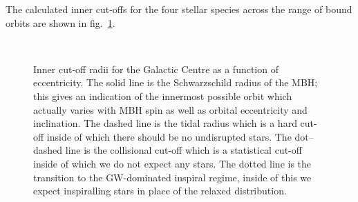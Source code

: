 \documentclass[useAMS,usedcolumn,usegraphicx,usenatbib]{mn2e}
\newcommand{\figref}[1]{fig.~\ref{fig:#1}}
\begin{document}
The calculated inner cut-offs for the four stellar species across the range of bound orbits are shown in \figref{Cuts}.
\begin{figure}
\begin{center}
    \quad 
    \\
    \quad
\caption{Inner cut-off radii for the Galactic Centre as a function of eccentricity. The solid line is the Schwarzschild radius of the MBH; this gives an indication of the innermost possible orbit which actually varies with MBH spin as well as orbital eccentricity and inclination. The dashed line is the tidal radius which is a hard cut-off inside of which there should be no undisrupted stars. The dot--dashed line is the collisional cut-off which is a statistical cut-off inside of which we do not expect any stars. The dotted line is the transition to the GW-dominated inspiral regime, inside of this we expect inspiralling stars in place of the relaxed distribution.\label{fig:Cuts}}
  \end{center}
\end{figure}
\end{document}
